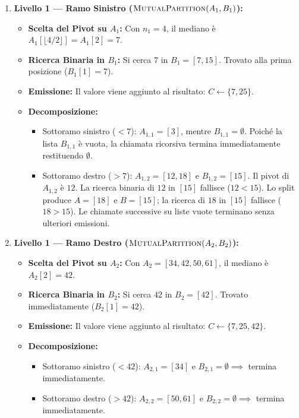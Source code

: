 \begin{enumerate}
  \item \textbf{Livello 1 --- Ramo Sinistro ($\textsc{MutualPartition}(A_1, B_1)$):}
  \begin{itemize}
    \item \textbf{Scelta del Pivot su $A_1$:} Con $n_1 = 4$, il mediano \`e $A_1[\lfloor 4/2 \rfloor] = A_1[2] = 7$.
    \item \textbf{Ricerca Binaria in $B_1$:} Si cerca $7$ in $B_1 = [7, 15]$. Trovato alla prima posizione ($B_1[1] = 7$).
    \item \textbf{Emissione:} Il valore viene aggiunto al risultato: $C \leftarrow \{7, 25\}$.
    \item \textbf{Decomposizione:}
    \begin{itemize}
      \item Sottoramo sinistro ($< 7$): $A_{1,1} = [3]$, mentre $B_{1,1} = \emptyset$. Poich\'e la lista $B_{1,1}$ \`e vuota, la chiamata ricorsiva termina immediatamente restituendo $\emptyset$.
      \item Sottoramo destro ($> 7$): $A_{1,2} = [12, 18]$ e $B_{1,2} = [15]$. Il pivot di $A_{1,2}$ \`e $12$. La ricerca binaria di $12$ in $[15]$ fallisce ($12 < 15$). Lo split produce $A = [18]$ e $B = [15]$; la ricerca di $18$ in $[15]$ fallisce ($18 > 15$). Le chiamate successive su liste vuote terminano senza ulteriori emissioni.
    \end{itemize}
  \end{itemize}

  \item \textbf{Livello 1 --- Ramo Destro ($\textsc{MutualPartition}(A_2, B_2)$):}
  \begin{itemize}
    \item \textbf{Scelta del Pivot su $A_2$:} Con $A_2 = [34, 42, 50, 61]$, il mediano \`e $A_2[2] = 42$.
    \item \textbf{Ricerca Binaria in $B_2$:} Si cerca $42$ in $B_2 = [42]$. Trovato immediatamente ($B_2[1] = 42$).
    \item \textbf{Emissione:} Il valore viene aggiunto al risultato: $C \leftarrow \{7, 25, 42\}$.
    \item \textbf{Decomposizione:}
    \begin{itemize}
      \item Sottoramo sinistro ($< 42$): $A_{2,1} = [34]$ e $B_{2,1} = \emptyset \implies$ termina immediatamente.
      \item Sottoramo destro ($> 42$): $A_{2,2} = [50, 61]$ e $B_{2,2} = \emptyset \implies$ termina immediatamente.
    \end{itemize}
  \end{itemize}
\end{enumerate}

